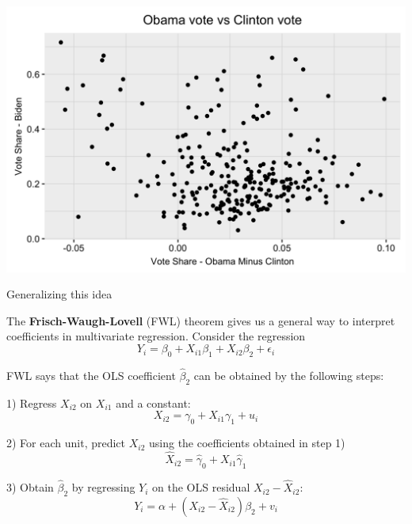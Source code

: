 \documentclass[11pt,english,handout]{beamer}
\newenvironment{wideitemize}{\itemize\addtolength{\itemsep}{10pt}}{\enditemize}
\begin{document}
	\begin{frame}
		\centering
		\includegraphics[width = 0.8 \linewidth]{biden-obama-minus-clinton}
	\end{frame}


	\begin{frame}{Generalizing this idea}
		\begin{wideitemize}
			\item
			The \textbf{Frisch-Waugh-Lovell} (FWL) theorem gives us a general way to interpret coefficients in multivariate regression. \pause Consider the regression
			$$Y_i = \beta_0 + X_{i1} \beta_1 + X_{i2} \beta_2 + \epsilon_i$$
			
			
			\pause
			\item
			FWL says that the OLS coefficient $\hat\beta_2$ can be obtained by the following steps:
			
			\pause
			\item
			1) Regress $X_{i2}$ on $X_{i1}$ and a constant:
			$$X_{i2} = \gamma_0 + X_{i1} \gamma_1 + u_i $$
			
			\pause
			\item
			2) For each unit, predict $X_{i2}$ using the coefficients obtained in step 1)
			$$\hat{X}_{i2} = \hat\gamma_0 + X_{i1} \hat\gamma_1 $$
			
			\pause
			\item
			3) Obtain $\hat\beta_2$ by regressing $Y_i$ on the OLS residual $X_{i2} - \hat{X}_{i2}$:
			$$Y_i =  \alpha + (X_{i2} - \hat{X}_{i2})  \beta_2 + v_i$$
			
		\end{wideitemize}		
	\end{frame}
\end{document}
